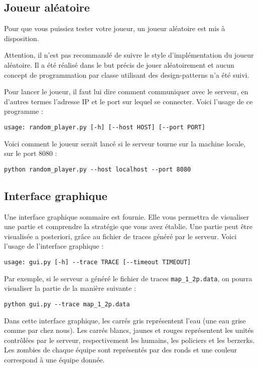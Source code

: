 
\subsection{Joueur aléatoire} %
Pour que vous puissiez tester votre joueur, un joueur aléatoire est mis à disposition.

\begin{warning}
Attention, il n'est pas recommandé de suivre le style d'implémentation du joueur aléatoire.
Il a été réalisé dans le but précis de jouer aléatoirement et aucun concept de programmation par classe utilisant des
design-patterns n'a été suivi.
\end{warning}

Pour lancer le joueur, il faut lui dire comment communiquer avec le serveur, en d'autres termes l'adresse IP et le port sur
lequel se connecter. Voici l'usage de ce programme :

\begin{lstlisting}
usage: random_player.py [-h] [--host HOST] [--port PORT] 
\end{lstlisting}

Voici comment le joueur serait lancé si le serveur tourne sur la machine locale, sur le port 8080 :

\begin{lstlisting}
python random_player.py --host localhost --port 8080 
\end{lstlisting}

\subsection{Interface graphique} %

Une interface graphique sommaire est fournie.
Elle vous permettra de visualiser une partie et comprendre la stratégie que vous avez établie.
Une partie peut être visualisée a posteriori, grâce au fichier de traces généré par le serveur.
Voici l'usage de l'interface graphique :
\begin{lstlisting}
usage: gui.py [-h] --trace TRACE [--timeout TIMEOUT]
\end{lstlisting}

Par exemple, si le serveur a généré le fichier de traces \lstinline!map_1_2p.data!, on pourra visualiser la partie de la manière suivante :
\begin{lstlisting}
python gui.py --trace map_1_2p.data
\end{lstlisting}

Dans cette interface graphique, les carrés gris représentent l'eau (une eau grise comme par chez nous).
Les carrés blancs, jaunes et rouges représentent les unités contrôlées par le serveur, respectivement les humains, les policiers et les berzerks.
Les zombies de chaque équipe sont représentés par des ronds et une couleur correspond à une équipe donnée.





